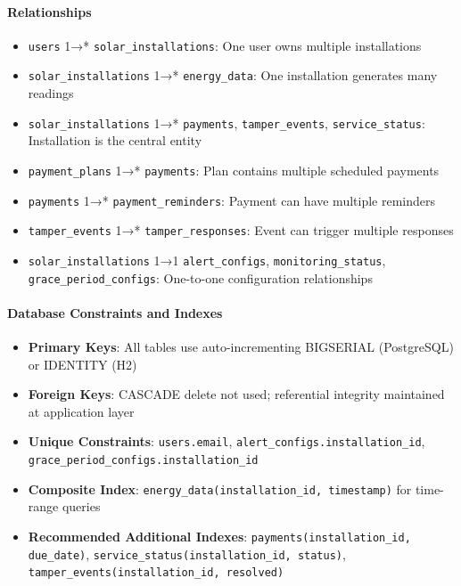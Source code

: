 \paragraph{Relationships}
\begin{itemize}
    \item \texttt{users} 1→* \texttt{solar\_installations}: One user owns multiple installations
    \item \texttt{solar\_installations} 1→* \texttt{energy\_data}: One installation generates many readings
    \item \texttt{solar\_installations} 1→* \texttt{payments}, \texttt{tamper\_events}, \texttt{service\_status}: Installation is the central entity
    \item \texttt{payment\_plans} 1→* \texttt{payments}: Plan contains multiple scheduled payments
    \item \texttt{payments} 1→* \texttt{payment\_reminders}: Payment can have multiple reminders
    \item \texttt{tamper\_events} 1→* \texttt{tamper\_responses}: Event can trigger multiple responses
    \item \texttt{solar\_installations} 1→1 \texttt{alert\_configs}, \texttt{monitoring\_status}, \texttt{grace\_period\_configs}: One-to-one configuration relationships
\end{itemize}

\paragraph{Database Constraints and Indexes}
\begin{itemize}
    \item \textbf{Primary Keys}: All tables use auto-incrementing BIGSERIAL (PostgreSQL) or IDENTITY (H2)
    \item \textbf{Foreign Keys}: CASCADE delete not used; referential integrity maintained at application layer
    \item \textbf{Unique Constraints}: \texttt{users.email}, \texttt{alert\_configs.installation\_id}, \texttt{grace\_period\_configs.installation\_id}
    \item \textbf{Composite Index}: \texttt{energy\_data(installation\_id, timestamp)} for time-range queries
    \item \textbf{Recommended Additional Indexes}: \texttt{payments(installation\_id, due\_date)}, \texttt{service\_status(installation\_id, status)}, \texttt{tamper\_events(installation\_id, resolved)}
\end{itemize}

